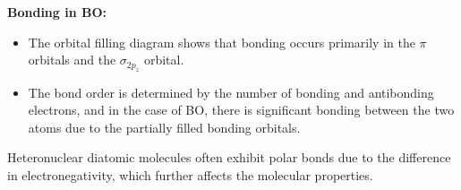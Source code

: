 \documentclass{report}
\begin{document}
\textbf{Bonding in BO:}
\begin{itemize}
    \item The orbital filling diagram shows that bonding occurs primarily in the $\pi$ orbitals and the $\sigma_{2p_z}$ orbital.
    \item The bond order is determined by the number of bonding and antibonding electrons, and in the case of BO, there is significant bonding between the two atoms due to the partially filled bonding orbitals.
\end{itemize}

Heteronuclear diatomic molecules often exhibit polar bonds due to the difference in electronegativity, which further affects the molecular properties.
\end{document}
